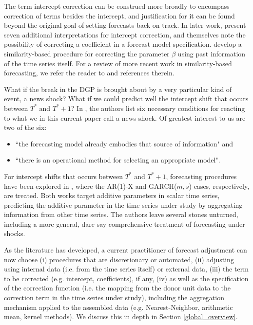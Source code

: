 \documentclass[11pt]{article}
\theoremstyle{definition}
\begin{document}
The term intercept correction can be construed more broadly to encompass correction of terms besides the intercept, and justification for it can be found beyond the original goal of setting forecasts back on track.  In later work, \cite{clements1999forecasting} present seven additional interpretations for intercept correction, and \cite{hendry1994theory, clements1999forecasting} themselves note the possibility of correcting a coefficient in a forecast model specification. \cite{guerron2017macroeconomic} develop a similarity-based procedure for correcting the parameter $\beta$ using past information of the time series itself.   For a review of more recent work in similarity-based forecasting, we refer the reader to \cite{lundquist2024volatility} and references therein.

What if the break in the DGP is brought about by a very particular kind of event, a news shock?   What if we could predict well the intercept shift that occurs between $T^{*}$ and $T^{*}+1$?  In \cite{castle2016overview}, the authors list six necessary conditions for reacting to what we in this current paper call a news shock.  Of greatest interest to us are two of the six: 

\begin{itemize}
\item ``the forecasting model already embodies that source of information" and 
\item ``there is an operational method for selecting an appropriate model".
\end{itemize}   

For intercept shifts that occurs between $T^{*}$ and $T^{*}+1$, forecasting procedures have been explored in \cite{lin2021minimizing,lundquist2024volatility}, where the AR(1)-X and GARCH($m,s$) cases, respectively, are treated.  Both works target additive parameters in scalar time series, predicting the additive parameter in the time series under study by aggregating information from other time series.  The authors leave several stones unturned, including a more general, dare say comprehensive treatment of forecasting under shocks.

As the literature has developed, a current practitioner of forecast adjustment can now choose (i) procedures that are discretionary or automated, (ii) adjusting using internal data (i.e. from the time series itself) or external data, (iii) the term to be corrected (e.g. intercept, coefficients), if any, (iv) as well as the specification of the correction function (i.e. the mapping from the donor unit data to the correction term in the time series under study), including the aggregation mechanism applied to the assembled data (e.g. Nearest-Neighbor, arithmetic mean, kernel methods).  We discuss this in depth in Section \ref{global_overview}.
\end{document}
